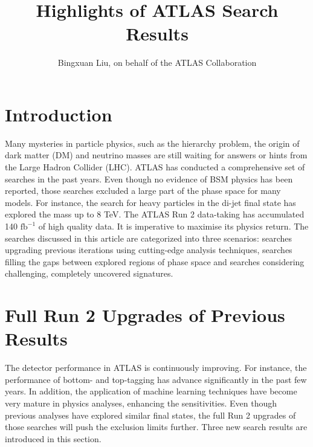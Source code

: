 \documentclass{moriond}
\begin{document}
\title{Highlights of ATLAS Search Results}

\author{Bingxuan Liu, on behalf of the ATLAS Collaboration}

\address{Department of Physics, Simon Fraser University, Vancouver, Canada}

\maketitle{}  

\section{Introduction}

Many mysteries in particle physics, such as the hierarchy problem, the origin
of dark matter (DM) and neutrino masses are still waiting for answers or hints
from the Large Hadron Collider (LHC). ATLAS has conducted a comprehensive set
of searches in the past years. Even though no evidence of BSM physics has been
reported, those searches excluded a large part of the phase space for many
models. For instance, the search for heavy particles in the di-jet final state
has explored the mass up to 8 TeV. The ATLAS Run 2 data-taking has accumulated
140 $\mathrm{fb}^{-1}$ of high quality data. It is imperative to maximise its
physics return. The searches discussed in this article are categorized into
three scenarios: searches upgrading previous iterations using cutting-edge
analysis techniques, searches filling the gaps between explored regions of
phase space and searches considering challenging, completely uncovered
signatures.      

\section{Full Run 2 Upgrades of Previous Results}

The detector performance in ATLAS is continuously improving. For instance, the
performance of bottom- and top-tagging has advance significantly in the past
few years. In addition, the application of machine learning techniques have
become very mature in physics analyses, enhancing the sensitivities. Even
though previous analyses have explored similar final states, the full Run 2
upgrades of those searches will push the exclusion limits further. Three new
search results are introduced in this section.\\
\end{document}
